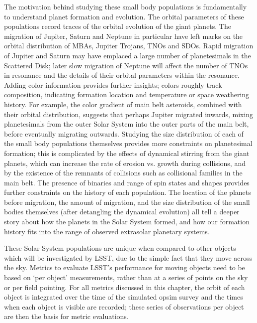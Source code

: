 The motivation behind studying these small body populations is
fundamentally to understand planet formation and evolution. The
orbital parameters of these populations record traces of the orbital
evolution of the giant planets. The migration of Jupiter, Saturn and
Neptune in particular have left marks on the orbital distribution of
MBAs, Jupiter Trojans, TNOs and SDOs. Rapid migration of
Jupiter and Saturn may have emplaced a large number of planetesimals
in the Scattered Disk; later slow migration of Neptune will affect the
number of TNOs in resonance and the details of their orbital parameters
within the resonance. Adding color information provides further
insights; colors roughly track composition, indicating formation
location and temperature or space weathering history. For example, the color
gradient of main belt asteroids, combined with their orbital
distribution, suggests that perhaps Jupiter migrated inwards,
mixing planetesimals from the outer Solar System into the outer parts
of the main belt, before eventually migrating outwards. Studying the
size distribution of each of the small body populations themselves
provides more constraints on planetesimal formation; this is
complicated by the effects of dynamical stirring from the giant
planets, which can increase the rate of erosion vs. growth during
collisions, and by the existence of the remnants of collisions such as
collisional families in the main belt. The presence of binaries and range
of spin states and shapes provides further constraints on the history
of each population. The location
of the planets before migration, the amount of migration, and the size
distribution of the small bodies themselves (after detangling the
dynamical evolution) all tell a deeper story about how the planets in
the Solar System formed, and how our formation history fits into the
range of observed extrasolar planetary systems.

These Solar System populations are unique when compared to other
objects which will be investigated by LSST, due to the simple fact
that they move across the sky. Metrics to evaluate
LSST's performance for moving objects need to be based on `per object'
measurements, rather than at a series of points on the sky or per
field pointing. For all metrics discussed in this chapter, the orbit
of each object is integrated over the time of the simulated opsim
survey and the times when each object is visible are recorded; these
series of observations per object are then the basis for metric
evaluations.


